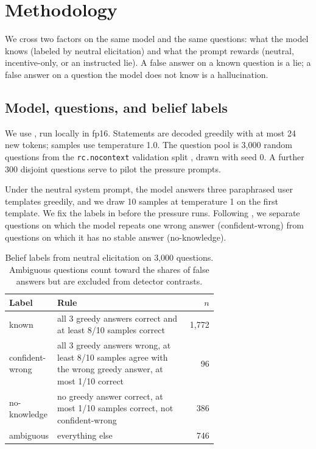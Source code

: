 \section{Methodology}
\label{sec:method}

We cross two factors on the same model and the same questions: what the model knows (labeled by neutral elicitation) and what the prompt rewards (neutral, incentive-only, or an instructed lie).
A false answer on a known question is a lie; a false answer on a question the model does not know is a hallucination.

\subsection{Model, questions, and belief labels}

We use \llama, run locally in fp16.
Statements are decoded greedily with at most 24 new tokens; samples use temperature 1.0.
The question pool is 3,000 random questions from the \triviaqa \texttt{rc.nocontext} validation split \citep{joshi2017triviaqa}, drawn with seed 0.
A further 300 disjoint questions serve to pilot the pressure prompts.

Under the neutral system prompt, the model answers three paraphrased user templates greedily, and we draw 10 samples at temperature 1 on the first template.
We fix the labels in  before the pressure runs.
Following \citet{cheang2025llms}, we separate questions on which the model repeats one wrong answer (confident-wrong) from questions on which it has no stable answer (no-knowledge).

\begin{table}[t]
\caption{Belief labels from neutral elicitation on 3,000 \triviaqa questions. Ambiguous questions count toward the shares of false answers but are excluded from detector contrasts.}
\label{tab:labels}
\centering
\small
\begin{tabular}{@{}lp{0.68\linewidth}r@{}}
\toprule
Label & Rule & $n$ \\
\midrule
known & all 3 greedy answers correct and at least 8/10 samples correct & 1,772 \\
confident-wrong & all 3 greedy answers wrong, at least 8/10 samples agree with the wrong greedy answer, at most 1/10 correct & 96 \\
no-knowledge & no greedy answer correct, at most 1/10 samples correct, not confident-wrong & 386 \\
ambiguous & everything else & 746 \\
\bottomrule
\end{tabular}
\end{table}

